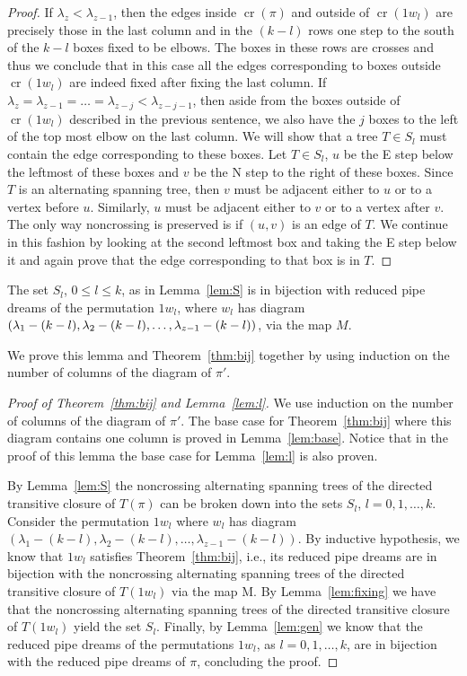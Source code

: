 \documentclass[ALCO,ThmDefs]{cedram}
\numberwithin{equation}{section}
\DeclareMathOperator{\rmcr}{cr}
\newcommand*\+{\smash{\lower2pt\hbox{\rlap{\vrule height14pt}}\raise2pt\hbox{\rlap{\hskip-3pt \vrule height.4pt depth0pt width14.7pt}}}}
\begin{document}
\begin{proof}
If $\lambda_z<\lambda_{z-1}$, then the edges inside $\rmcr(\pi)$ and outside of $\rmcr(1w_l)$ are precisely those in the last column and in the $(k-l)$ rows one step to the south of the $k-l$ boxes fixed to be elbows. The boxes in these rows are crosses and thus we conclude that in this case all the edges corresponding to boxes outside $\rmcr(1w_l)$ are indeed fixed after fixing the last column. If $\lambda_z=\lambda_{z-1}=\dots=\lambda_{z-j}<\lambda_{z-j-1}$, then aside from the boxes outside of $\rmcr(1w_l)$ described in the previous sentence, we also have the $j$ boxes to the left of the top most elbow on the last column. We will show that a tree $T\in S_l$ must contain the edge corresponding to these boxes. Let $T\in S_l$, $u$ be the E step below the leftmost of these boxes and $v$ be the N step to the right of these boxes. Since $T$ is an alternating spanning tree, then $v$ must be adjacent either to $u$ or to a vertex before $u$. Similarly, $u$ must be adjacent either to $v$ or to a vertex after $v$. The only way noncrossing is preserved is if $(u,v)$ is an edge of $T$. We continue in this fashion by looking at the second leftmost box and taking the E step below it and again prove that the edge corresponding to that box is in $T$.
\end{proof}

\begin{lemm}\label{lem:l}
The set $S_l$, $0\leq l\leq k$, as in Lemma~\ref{lem:S} is in bijection with reduced pipe dreams of the permutation $1w_l$, where $w_l$ has diagram $(\lambda_1-(k-l), \lambda_2-\linebreak(k-l), \dots, \lambda_{z-1}-(k-l))$, via the map $M$.
\end{lemm}

We prove this lemma and Theorem~\ref{thm:bij} together by using induction on the number of columns of the diagram of $\pi'$.

\begin{proof}[Proof of Theorem~\ref{thm:bij} and Lemma~\ref{lem:l}]
We use induction on the number of columns of the diagram of $\pi'$. The base case for Theorem~\ref{thm:bij} where this diagram contains one column is proved in Lemma~\ref{lem:base}. Notice that in the proof of this lemma the base case for Lemma~\ref{lem:l} is also proven.

By Lemma~\ref{lem:S} the noncrossing alternating spanning trees of the directed transitive closure of $T(\pi)$ can be broken down into the sets $S_l$, $l=0,1,\dots, k$. Consider the permutation $1w_l$ where $w_l$ has diagram $(\lambda_1-(k-l), \lambda_2-(k-l), \dots, \lambda_{z-1}-(k-l))$. By inductive hypothesis, we know that $1w_l$ satisfies Theorem~\ref{thm:bij}, i.e., its reduced pipe dreams are in bijection with the noncrossing alternating spanning trees of the directed transitive closure of $T(1w_l)$ via the map M. By Lemma~\ref{lem:fixing} we have that the noncrossing alternating spanning trees of the directed transitive closure of $T(1w_l)$ yield the set $S_l$. Finally, by Lemma~\ref{lem:gen} we know that the reduced pipe dreams of the permutations $1w_l$, as $l=0,1,\dots, k$, are in bijection with the reduced pipe dreams of $\pi$, concluding the proof.
\end{proof}
\end{document}
